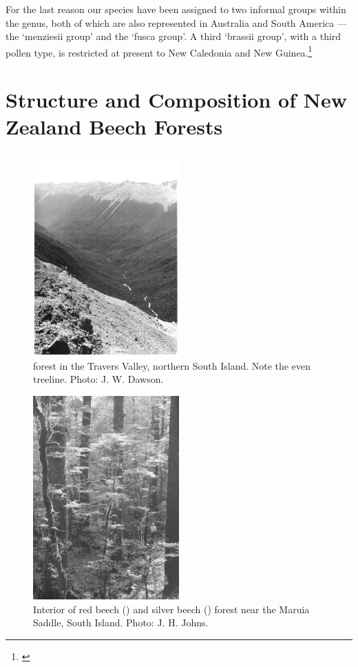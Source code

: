 For the last reason our species have been assigned to two informal groups within the genus, both of which are also represented in Australia and South America — the `menziesii group' and the `fusca group'.
A third `brassii group', with a third pollen type, is restricted at present to New Caledonia and New Guinea.\footnote{\cite{cranwell1939southern}}

\section{Structure and Composition of New Zealand Beech Forests}

\begin{figure}
	\includegraphics[width=0.5\textwidth]{graphics/figure71nothofagus-forest.jpg}
	\centering
	\caption[Nothofagus forest in the Travers Valley]{ forest in the Travers Valley, northern South Island.
    Note the even treeline.
	Photo: J. W. Dawson.}
	\label{fig:71nothofagus-forest}
\end{figure}

\begin{figure}
	\includegraphics[width=0.5\textwidth]{graphics/figure72beech.jpg}
	\centering
	\caption[Interior of red beech and silver beech forest]{Interior of red beech () and silver beech () forest near the Maruia Saddle, South Island.
	Photo: J. H. Johns.}
	\label{fig:72beech}
\end{figure}

